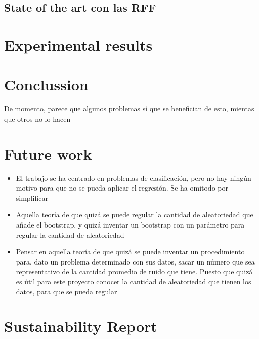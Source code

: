 \documentclass{article}
\begin{document}
\subsection{State of the art con las RFF}



\section{Experimental results}
\section{Conclussion}
De momento, parece que algunos problemas sí que se benefician de esto, mientas
que otros no lo hacen
\section{Future work}
\begin{itemize}
 \item El trabajo se ha centrado en problemas de clasificación, pero no hay
       ningún motivo para que no se pueda aplicar el regresión. Se ha omitodo por
       simplificar
 \item Aquella teoría de que quizá se puede regular la cantidad de aleatoriedad
       que añade el bootstrap, y quizá inventar un bootstrap con un parámetro para
       regular la cantidad de aleatoriedad
 \item Pensar en aquella teoría de que quizá se puede inventar un procedimiento
       para, dato un problema determinado con sus datos, sacar un número que sea
       representativo de la cantidad promedio de ruido que tiene. Puesto que quizá
       es útil para este proyecto conocer la cantidad de aleatoriedad que tienen
       los datos, para que se pueda regular
\end{itemize}
\section{Sustainability Report}

\end{document}
